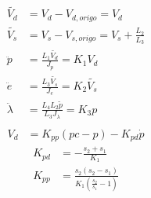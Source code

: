 \begin{subequations}\label{eq:lin_model}
	\begin{align}
        \tilde{V_d} &= V_d-V_{d,origo} = V_d\\
        \tilde{V_s} &= V_s-V_{s,origo} = V_s+\frac{L_2}{L_3}\\
		\ddot{p}  &= \frac{L_1\tilde{V_d}}{J_p} = K_1V_d\label{eq:lin_p} \\
		\ddot{e}  &= \frac{L_3\tilde{V_s}}{J_e} = K_2\tilde{V_s}\label{eq:lin_e} \\
		\ddot{\lambda} &= \frac{L_4L_2\tilde{p}}{L_3J_{\lambda}} = K_3p\label{eq:lin_l} \\
	\end{align}
\end{subequations}
\begin{subequations}\label{eq:PD}
	\begin{align}
        V_d &= K_{pp}(pc-p)-K_{pd}\dot{p}
	\end{align}
\end{subequations}
\begin{subequations}\label{eq:pole_place}
	\begin{align}
    K_{pd} &= -\frac{s_2+s_1}{K_1}\\
    K_{pp} &= \frac{s_2(s_2-s_1)}{K_1(\frac{s_2}{s_1}-1)}
	\end{align}
\end{subequations}

